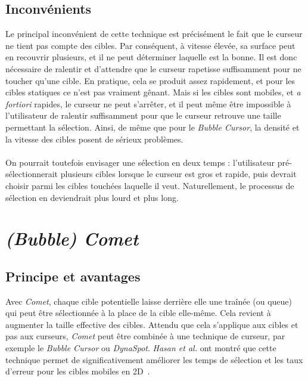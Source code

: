 	\subsection{Inconvénients}
	Le principal inconvénient de cette technique est précisément le fait que le curseur ne tient pas compte des cibles. Par conséquent, à vitesse élevée, sa surface peut en recouvrir plusieurs, et il ne peut déterminer laquelle est la bonne. Il est donc nécessaire de ralentir et d'attendre que le curseur rapetisse suffisamment pour ne toucher qu'une cible. En pratique, cela se produit assez rapidement, et pour les cibles statiques ce n'est pas vraiment gênant. Mais si les cibles sont mobiles, et \emph{a fortiori} rapides, le curseur ne peut s'arrêter, et il peut même être impossible à l'utilisateur de ralentir suffisamment pour que le curseur retrouve une taille permettant la sélection. Ainsi, de même que pour le \emph{Bubble Cursor}, la densité et la vitesse des cibles posent de sérieux problèmes.

	\paragraph{}	
	On pourrait toutefois envisager une sélection en deux temps : l'utilisateur pré-sélectionnerait plusieurs cibles lorsque le curseur est gros et rapide, puis devrait choisir parmi les cibles touchées laquelle il veut. Naturellement, le processus de sélection en deviendrait plus lourd et plus long.

\section{\emph{(Bubble) Comet}}
	\subsection{Principe et avantages}
	Avec \emph{Comet}, chaque cible potentielle laisse derrière elle une traînée (ou queue) qui peut être sélectionnée à la place de la cible elle-même. Cela revient à augmenter la taille effective des cibles. Attendu que cela s'applique aux cibles et pas aux curseurs, \emph{Comet} peut être combinée à une technique de curseur, par exemple le \emph{Bubble Cursor} ou \emph{DynaSpot}. \emph{Hasan et al.} ont montré que cette technique permet de significativement améliorer les temps de sélection et les taux d'erreur pour les cibles mobiles en 2D~\cite{hasan2011comet}.
	
